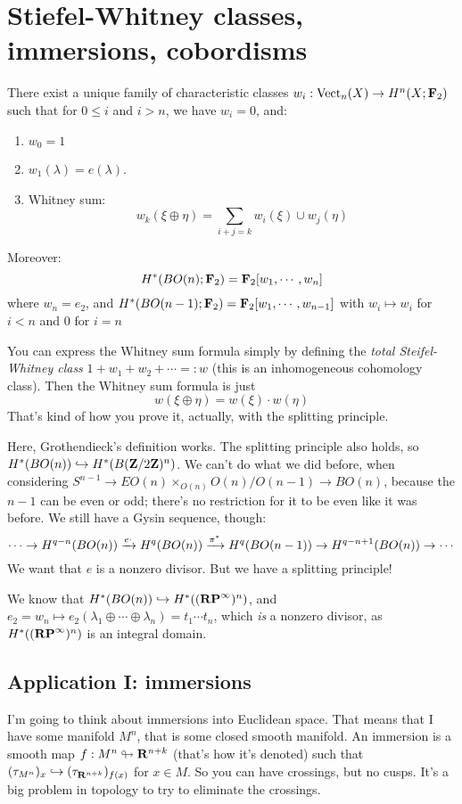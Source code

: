 \section{Stiefel-Whitney classes, immersions, cobordisms}
\begin{theorem}
    There exist a unique family of characteristic classes $w_i:\operatorname{Vect}_n(X) \to H^n(X;\mathbf F_2)$ such that for $0\leq i$ and $i>n$, we have $w_i=0$, and:
    \begin{enumerate}
	\item $w_0 = 1$
	\item $w_1(\lambda) = e(\lambda)$.
	\item Whitney sum:
	    \begin{equation*}
		w_k(\xi\oplus\eta) = \sum_{i+j=k} w_i(\xi)\cup w_j(\eta)
	    \end{equation*}
    \end{enumerate}
    Moreover:
    $$
    H^\ast(BO(n);\mathbf F_2) = \mathbf F_2[w_1,\cdots,w_n]
    $$
    where $w_n = e_2$, and $H^\ast(BO(n-1);\mathbf F_2) = \mathbf F_2[w_1,\cdots,w_{n-1}]$ with $w_i\mapsto w_i$ for $i<n$ and $0$ for $i=n$
\end{theorem}
\begin{remark}
    You can express the Whitney sum formula simply by defining the \emph{total Steifel-Whitney class} $1 + w_1 + w_2 + \cdots=:w$ (this is an inhomogeneous cohomology class).
    Then the Whitney sum formula is just
    $$
    w(\xi\oplus\eta) = w(\xi)\cdot w(\eta)
    $$
    That's kind of how you prove it, actually, with the splitting principle.
\end{remark}
Here, Grothendieck's definition works.
The splitting principle also holds, so $H^\ast(BO(n))\hookrightarrow H^\ast(B(\mathbf Z/2\mathbf Z)^n)$.
We can't do what we did before, when considering $S^{n-1} \to EO(n)\times_{O(n)} O(n)/O(n-1)\to BO(n)$, because the $n-1$ can be even or odd; there's no restriction for it to be even like it was before.
We still have a Gysin sequence, though:
$$
\cdots\to H^{q-n}(BO(n))\xrightarrow{{e\cdot}} H^q(BO(n)) \xrightarrow{{\pi^\ast}} H^q(BO(n-1)) \to H^{q-n+1}(BO(n))\to\cdots
$$
We want that $e$ is a nonzero divisor.
But we have a splitting principle!

We know that $H^\ast(BO(n)) \hookrightarrow H^\ast((\mathbf{RP}^\infty)^n)$, and $e_2=w_n\mapsto e_2(\lambda_1\oplus\cdots\oplus\lambda_n) = t_1\cdots t_n$, which \emph{is} a nonzero divisor, as $H^\ast((\mathbf{RP}^\infty)^n)$ is an integral domain.
\subsection{Application I: immersions}
I'm going to think about immersions into Euclidean space.
That means that I have some manifold $M^n$, that is some closed smooth manifold.
An immersion is a smooth map $f:M^n\looparrowright \mathbf R^{n+k}$ (that's how it's denoted) such that $(\tau_{M^n})_x \hookrightarrow (\tau_{\mathbf R^{n+k}})_{f(x)}$ for $x\in M$.
So you can have crossings, but no cusps.
It's a big problem in topology to try to eliminate the crossings.

